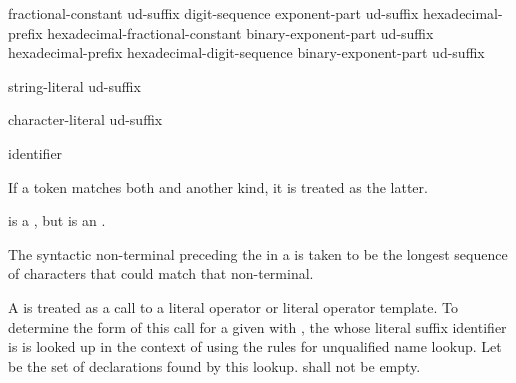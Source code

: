 \documentclass{wg21}
\begin{document}
\begin{bnf}
    \br
    fractional-constant  ud-suffix\br
    digit-sequence exponent-part ud-suffix\br
    hexadecimal-prefix hexadecimal-fractional-constant binary-exponent-part ud-suffix\br
    hexadecimal-prefix hexadecimal-digit-sequence binary-exponent-part ud-suffix
\end{bnf}

\begin{bnf}
    \br
    string-literal ud-suffix
\end{bnf}

\begin{bnf}
    \br
    character-literal ud-suffix
\end{bnf}

\begin{bnf}
    \br
    identifier
\end{bnf}

\pnum
If a token matches both  and another  kind, it
is treated as the latter.
\begin{example}
    is a , but  is an
    .
\end{example}
The syntactic non-terminal preceding the  in a
 is taken to be the longest sequence of
characters that could match that non-terminal.

\pnum
A  is treated as a call to a literal operator or
literal operator template. To determine the form of this call for a
given   with  ,
the  whose literal suffix identifier is  is
looked up in the context of  using the rules for unqualified name
lookup. Let  be the set of declarations found by
this lookup.  shall not be empty.
\end{document}
